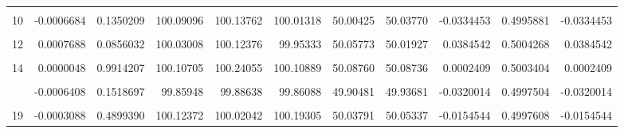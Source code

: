 \documentclass[a4paper]{tufte-handout}
\begin{document}
\begin{table}
{\begin{tabular}[t]{rrrrrrrrrrr}
\cellcolor{gray!6}{9} & \cellcolor{gray!6}{0.0001845} & \cellcolor{gray!6}{0.6798832} & \cellcolor{gray!6}{99.99130} & \cellcolor{gray!6}{99.91004} & \cellcolor{gray!6}{100.03260} & \cellcolor{gray!6}{49.99488} & \cellcolor{gray!6}{49.98566} & \cellcolor{gray!6}{0.0092239} & \cellcolor{gray!6}{0.4999924} & \cellcolor{gray!6}{0.0092239}\\
10 & -0.0006684 & 0.1350209 & 100.09096 & 100.13762 & 100.01318 & 50.00425 & 50.03770 & -0.0334453 & 0.4995881 & -0.0334453\\
\addlinespace
\cellcolor{gray!6}{11} & \cellcolor{gray!6}{0.0005206} & \cellcolor{gray!6}{0.2444083} & \cellcolor{gray!6}{99.92114} & \cellcolor{gray!6}{99.93640} & \cellcolor{gray!6}{99.94230} & \cellcolor{gray!6}{49.99569} & \cellcolor{gray!6}{49.96968} & \cellcolor{gray!6}{0.0260129} & \cellcolor{gray!6}{0.5003515} & \cellcolor{gray!6}{0.0260129}\\
12 & 0.0007688 & 0.0856032 & 100.03008 & 100.12376 & 99.95333 & 50.05773 & 50.01927 & 0.0384542 & 0.5004268 & 0.0384542\\
\cellcolor{gray!6}{13} & \cellcolor{gray!6}{-0.0001434} & \cellcolor{gray!6}{0.7484204} & \cellcolor{gray!6}{100.01911} & \cellcolor{gray!6}{99.99394} & \cellcolor{gray!6}{100.09906} & \cellcolor{gray!6}{50.01607} & \cellcolor{gray!6}{50.02325} & \cellcolor{gray!6}{-0.0071749} & \cellcolor{gray!6}{0.5000652} & \cellcolor{gray!6}{-0.0071749}\\
14 & 0.0000048 & 0.9914207 & 100.10705 & 100.24055 & 100.10889 & 50.08760 & 50.08736 & 0.0002409 & 0.5003404 & 0.0002409\\
\cellcolor{gray!6}{16} & \cellcolor{gray!6}{0.0001215} & \cellcolor{gray!6}{0.7857846} & \cellcolor{gray!6}{100.05458} & \cellcolor{gray!6}{100.13252} & \cellcolor{gray!6}{100.17808} & \cellcolor{gray!6}{50.08374} & \cellcolor{gray!6}{50.07765} & \cellcolor{gray!6}{0.0060868} & \cellcolor{gray!6}{0.5005642} & \cellcolor{gray!6}{0.0060868}\\
\addlinespace
17 & -0.0006408 & 0.1518697 & 99.85948 & 99.88638 & 99.86088 & 49.90481 & 49.93681 & -0.0320014 & 0.4997504 & -0.0320014\\
\cellcolor{gray!6}{18} & \cellcolor{gray!6}{0.0001450} & \cellcolor{gray!6}{0.7456971} & \cellcolor{gray!6}{100.02241} & \cellcolor{gray!6}{99.93323} & \cellcolor{gray!6}{99.93438} & \cellcolor{gray!6}{49.97415} & \cellcolor{gray!6}{49.96690} & \cellcolor{gray!6}{0.0072472} & \cellcolor{gray!6}{0.4996295} & \cellcolor{gray!6}{0.0072472}\\
19 & -0.0003088 & 0.4899390 & 100.12372 & 100.02042 & 100.19305 & 50.03791 & 50.05337 & -0.0154544 & 0.4997608 & -0.0154544\\

\end{tabular}}
\end{table}
\end{document}
